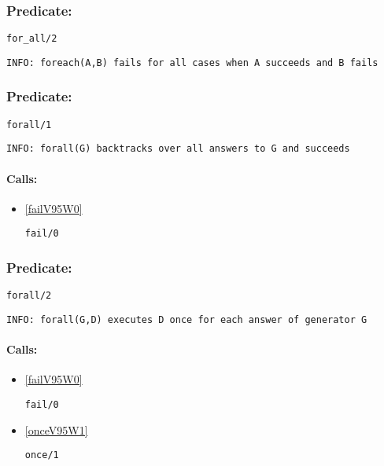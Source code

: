 \subsubsection{Predicate:} \label{forV95WallV95W2}

\begin{verbatim}
for_all/2
\end{verbatim}

{\small \begin{verbatim}
INFO: foreach(A,B) fails for all cases when A succeeds and B fails

\end{verbatim}}

\subsubsection{Predicate:} \label{forallV95W1}

\begin{verbatim}
forall/1
\end{verbatim}

{\small \begin{verbatim}
INFO: forall(G) backtracks over all answers to G and succeeds

\end{verbatim}}
\paragraph{Calls:} 
\begin{itemize}
\item \ref{failV95W0} 
\begin{verbatim}
fail/0
\end{verbatim}

\end{itemize}

\subsubsection{Predicate:} \label{forallV95W2}

\begin{verbatim}
forall/2
\end{verbatim}

{\small \begin{verbatim}
INFO: forall(G,D) executes D once for each answer of generator G

\end{verbatim}}
\paragraph{Calls:} 
\begin{itemize}
\item \ref{failV95W0} 
\begin{verbatim}
fail/0
\end{verbatim}

\item \ref{onceV95W1} 
\begin{verbatim}
once/1
\end{verbatim}

\end{itemize}

